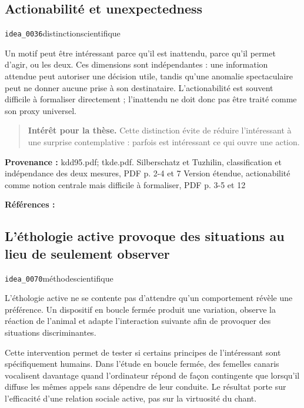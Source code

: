 \documentclass[10pt,a4paper]{article}
\begin{document}
\subsection{Actionabilité et unexpectedness}
{\small\color{metadata} \texttt{idea\_0036}\quad\textbullet\quad distinction\quad\textbullet\quad scientifique\par}

Un motif peut être intéressant parce qu'il est inattendu, parce qu'il permet d'agir, ou les deux. Ces dimensions sont indépendantes : une information attendue peut autoriser une décision utile, tandis qu'une anomalie spectaculaire peut ne donner aucune prise à son destinataire. L'actionabilité est souvent difficile à formaliser directement ; l'inattendu ne doit donc pas être traité comme son proxy universel.

\begin{quote}
\textbf{Intérêt pour la thèse.} Cette distinction évite de réduire l'intéressant à une surprise contemplative : parfois est intéressant ce qui ouvre une action.
\end{quote}
{\footnotesize\color{metadata}\textbf{Provenance :} kdd95.pdf; tkde.pdf. Silberschatz et Tuzhilin, classification et indépendance des deux mesures, PDF p. 2-4 et 7 Version étendue, actionabilité comme notion centrale mais difficile à formaliser, PDF p. 3-5 et 12\par}
{\footnotesize\color{metadata}\textbf{Références :} \parencite{silberschatz1995subjective,silberschatz1996patterns}\par}

\subsection{L'éthologie active provoque des situations au lieu de seulement observer}
{\small\color{metadata} \texttt{idea\_0070}\quad\textbullet\quad méthode\quad\textbullet\quad scientifique\par}

L'éthologie active ne se contente pas d'attendre qu'un comportement révèle une préférence. Un dispositif en boucle fermée produit une variation, observe la réaction de l'animal et adapte l'interaction suivante afin de provoquer des situations discriminantes.

Cette intervention permet de tester si certains principes de l'intéressant sont spécifiquement humains. Dans l'étude en boucle fermée, des femelles canaris vocalisent davantage quand l'ordinateur répond de façon contingente que lorsqu'il diffuse les mêmes appels sans dépendre de leur conduite. Le résultat porte sur l'efficacité d'une relation sociale active, pas sur la virtuosité du chant.
\end{document}
